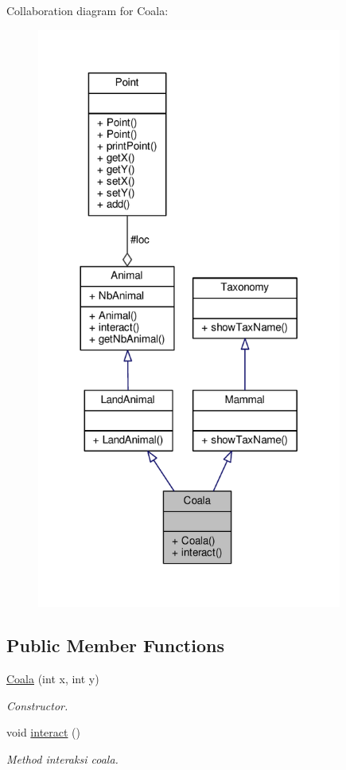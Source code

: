 Collaboration diagram for Coala\+:
\nopagebreak
\begin{figure}[H]
\begin{center}
\leavevmode
\includegraphics[width=284pt]{classCoala__coll__graph}
\end{center}
\end{figure}
\subsection*{Public Member Functions}
\begin{DoxyCompactItemize}
\item 
\hyperlink{classCoala_aad5c9bf3e235b775b21b5ffaf8d255f5}{Coala} (int x, int y)
\begin{DoxyCompactList}\small\item\em Constructor. \end{DoxyCompactList}\item 
void \hyperlink{classCoala_ad7d35de3f38bb1b708efec0a5c2c72a0}{interact} ()\hypertarget{classCoala_ad7d35de3f38bb1b708efec0a5c2c72a0}{}\label{classCoala_ad7d35de3f38bb1b708efec0a5c2c72a0}

\begin{DoxyCompactList}\small\item\em Method interaksi coala. \end{DoxyCompactList}\end{DoxyCompactItemize}
